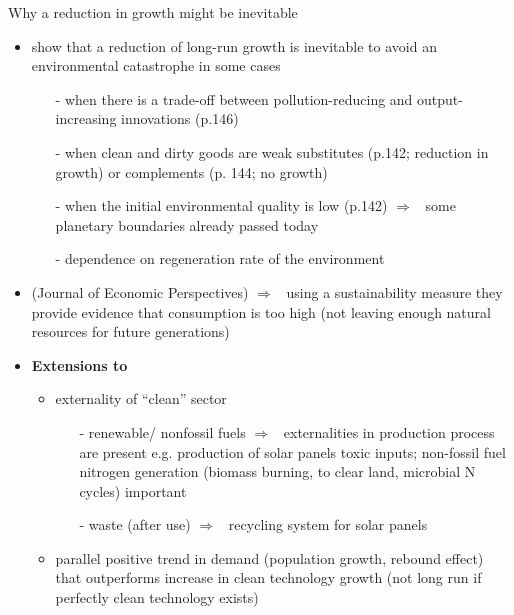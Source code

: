 \documentclass[11pt,aspectratio=169]{beamer}
\newcommand{\ar}{$\Rightarrow$ \ }
\begin{document}
\begin{frame}[allowframebreaks]{Why a reduction in growth might be inevitable}
\begin{itemize}
	\item \cite{Acemoglu2012TheChange} show that a reduction of long-run growth is inevitable to avoid an environmental catastrophe in some cases
	\begin{itemize}
\item[-] when there is a trade-off between pollution-reducing and output-increasing innovations (p.146)
\item[-] when clean and dirty goods are weak substitutes (p.142; reduction in growth)  or complements (p. 144; no growth)
\item[-] when the initial environmental quality is low (p.142) \ar some planetary boundaries already passed today \citep{Rockstrom2009AHumanity}
\item[-] dependence on regeneration rate of the environment
	\end{itemize}
\item \cite{Arrow2004AreMuch}(Journal of Economic Perspectives) \ar using a sustainability measure they provide evidence that consumption is too high (not leaving enough natural resources for future generations)


\item \textbf{\alert{Extensions to \cite{Acemoglu2012TheChange} }}
\begin{itemize}
\item externality of ``clean'' sector \citep[see also][]{Dasgupta2021}
\begin{itemize}
	\item[-] renewable/ nonfossil fuels \ar externalities in production process are present e.g. production of solar panels toxic inputs; non-fossil fuel nitrogen generation (biomass burning, to clear land, microbial N cycles) important \citep{Song2021ImportantEmissions} 
	\item[-] waste (after use) \ar recycling system for solar panels 
\end{itemize}
\item parallel positive trend in demand (population growth, rebound effect) that outperforms increase in clean technology growth (not long run if perfectly clean technology exists)

\end{itemize}
\end{itemize}
\end{frame}
\end{document}
